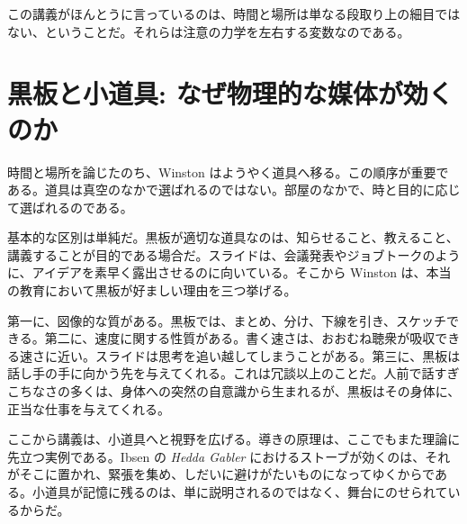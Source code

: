 \begin{figure}[h]
\centering
{}
\end{figure}

この講義がほんとうに言っているのは、時間と場所は単なる段取り上の細目ではない、ということだ。それらは注意の力学を左右する変数なのである。

\section{黒板と小道具: なぜ物理的な媒体が効くのか}

時間と場所を論じたのち、Winston はようやく道具へ移る。この順序が重要である。道具は真空のなかで選ばれるのではない。部屋のなかで、時と目的に応じて選ばれるのである。

基本的な区別は単純だ。黒板が適切な道具なのは、知らせること、教えること、講義することが目的である場合だ。スライドは、会議発表やジョブトークのように、アイデアを素早く露出させるのに向いている。そこから Winston は、本当の教育において黒板が好ましい理由を三つ挙げる。

第一に、図像的な質がある。黒板では、まとめ、分け、下線を引き、スケッチできる。第二に、速度に関する性質がある。書く速さは、おおむね聴衆が吸収できる速さに近い。スライドは思考を追い越してしまうことがある。第三に、黒板は話し手の手に向かう先を与えてくれる。これは冗談以上のことだ。人前で話すぎこちなさの多くは、身体への突然の自意識から生まれるが、黒板はその身体に、正当な仕事を与えてくれる。

ここから講義は、小道具へと視野を広げる。導きの原理は、ここでもまた理論に先立つ実例である。Ibsen の \emph{Hedda Gabler} におけるストーブが効くのは、それがそこに置かれ、緊張を集め、しだいに避けがたいものになってゆくからである。小道具が記憶に残るのは、単に説明されるのではなく、舞台にのせられているからだ。

